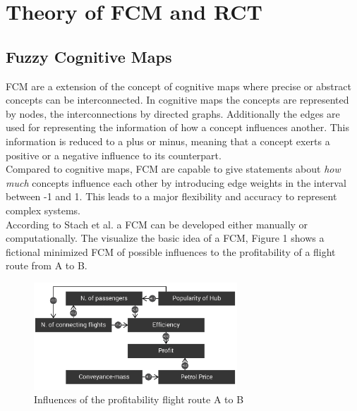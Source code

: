 \documentclass[conference]{IEEEtran}
\begin{document}
\section{Theory of FCM and RCT}
\subsection{Fuzzy Cognitive Maps}

FCM are a extension of the concept of cognitive maps where precise or abstract concepts can be interconnected\cite{kosko1986}. In cognitive maps the concepts are represented by nodes, the interconnections by directed graphs. Additionally the edges are used for representing the information of how a concept influences another. This information is reduced to a plus or minus, meaning that a concept exerts a positive or a negative influence to its counterpart.\\
Compared to cognitive maps, FCM are capable to give statements about \emph{how much} concepts influence each other by introducing edge weights in the interval between -1 and 1. This leads to a major flexibility and accuracy to represent complex systems.\\
According to Stach et al. \cite{stach2005} a FCM can be developed either manually or computationally. The visualize the basic idea of a FCM, Figure 1 shows a fictional minimized FCM of possible influences to the profitability of a flight route from A to B.

\begin{figure}[ht]
\includegraphics[width=3in]{img/ficFCM.png}
\caption{Influences of the profitability flight route A to B}
\label{fig:cm}
\end{figure}
\end{document}
